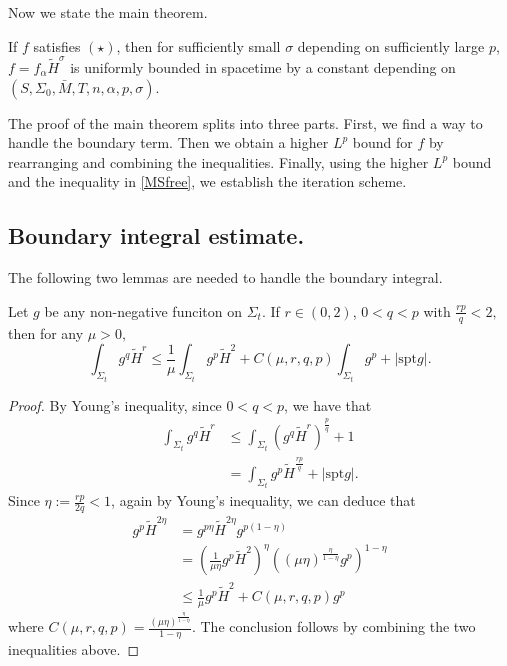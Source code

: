 Now we state the main theorem.

\begin{theorem} \label{stamit}
    If $f$ satisfies $(\star)$, then for sufficiently small $\sigma $ depending on sufficiently large $p$, $f=f_{\alpha }\tilde{H}^{\sigma }$ is uniformly bounded in spacetime by a constant depending on $(S,\Sigma _0,\bar{M},T,n,\alpha ,p,\sigma )$. 
\end{theorem}

The proof of the main theorem splits into three parts. First, we find a way to handle the boundary term. Then we obtain a higher $L^p$ bound for $f$ by rearranging and combining the inequalities. Finally, using the higher $L^p$ bound and the inequality in \autoref{MSfree}, we establish the iteration scheme.

\subsection{Boundary integral estimate.}

The following two lemmas are needed to handle the boundary integral.

\begin{lemma}\label{HSquare}
    Let $g$ be any non-negative funciton on $\Sigma_t.$ If $r \in (0,2)$, $0<q<p$ with $\frac{rp }{q}<2,$ then for any $\mu >0,$ 
    \[
        \int_{\Sigma_t} g^q \tilde{H}^r \leq \frac{1}{\mu }\int_{\Sigma_t} g^p \tilde{H}^2+C(\mu ,r,q,p )\int_{\Sigma_t} g^p + \left| \mathrm{spt } g \right|.    
    \]
\end{lemma}
\begin{proof}
    By Young's inequality, since $0<q<p$, we have that 
    \begin{equation*}
    \begin{split}
        \int_{\Sigma_t} g^q \tilde{H}^r 
    &\leq \int_{\Sigma_t} (g^q \tilde{H}^r)^{\frac{p}{q}}+1  \\
    &= \int_{\Sigma_t} g^p \tilde{H}^{\frac{rp }{q}}+\left| \mathrm{spt } g \right|.
    \end{split}
    \end{equation*} 
    Since $\eta := \frac{rp }{2q}<1$, again by Young's inequality, we can deduce that
    \begin{equation*}
    \begin{split}
        g^p \tilde{H}^{2\eta} 
    &= g^{p \eta }\tilde{H}^{2\eta}g^{p \left( 1-\eta \right) } \\
    &= \left( \frac{1}{\mu \eta  }g^{p}\tilde{H}^2 \right) ^{\eta} \left( (\mu \eta )^{\frac{\eta}{1-\eta } }g^p\right)^{1-\eta }\\
    & \leq \frac{1}{\mu }g^p\tilde{H}^2+C(\mu ,r,q,p)g^p
    \end{split}
    \end{equation*} 
    where $C(\mu ,r,q,p)=\frac{(\mu \eta )^{\frac{\eta}{1-\eta } }}{1-\eta }$.
    The conclusion follows by combining the two inequalities above.
\end{proof}

